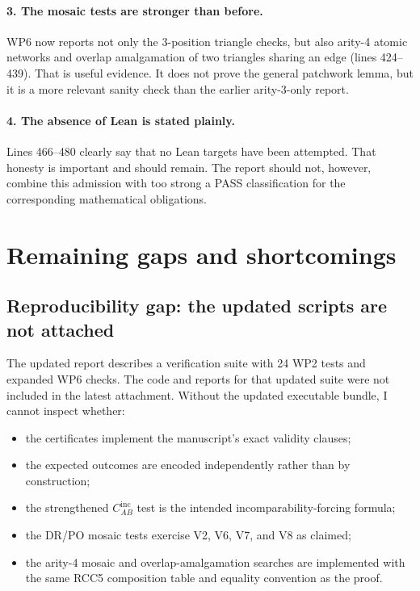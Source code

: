 \documentclass[11pt]{article}
\begin{document}
\paragraph{3. The mosaic tests are stronger than before.}
WP6 now reports not only the 3-position triangle checks, but also arity-4 atomic
networks and overlap amalgamation of two triangles sharing an edge (lines
424--439).  That is useful evidence.  It does not prove the general patchwork
lemma, but it is a more relevant sanity check than the earlier arity-3-only
report.

\paragraph{4. The absence of Lean is stated plainly.}
Lines 466--480 clearly say that no Lean targets have been attempted.  That
honesty is important and should remain.  The report should not, however, combine
this admission with too strong a PASS classification for the corresponding
mathematical obligations.

\section{Remaining gaps and shortcomings}

\subsection{Reproducibility gap: the updated scripts are not attached}

The updated report describes a verification suite with 24 WP2 tests and expanded
WP6 checks.  The code and reports for that updated suite were not included in the
latest attachment.  Without the updated executable bundle, I cannot inspect
whether:
\begin{itemize}[leftmargin=2em]
  \item the certificates implement the manuscript's exact validity clauses;
  \item the expected outcomes are encoded independently rather than by
    construction;
  \item the strengthened \(C_{AB}^{\mathrm{inc}}\) test is the intended
    incomparability-forcing formula;
  \item the DR/PO mosaic tests exercise V2, V6, V7, and V8 as claimed;
  \item the arity-4 mosaic and overlap-amalgamation searches are implemented
    with the same RCC5 composition table and equality convention as the proof.
\end{itemize}
\end{document}
